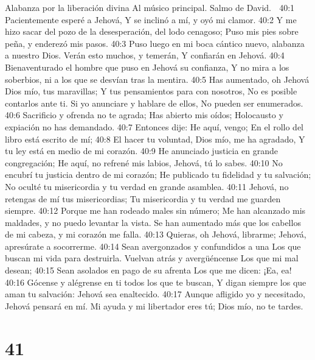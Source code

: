 Alabanza por la liberación divina 
Al músico principal. Salmo de David. 

40:1 Pacientemente esperé a Jehová, 
Y se inclinó a mí, y oyó mi clamor. 
40:2 Y me hizo sacar del pozo de la desesperación, del lodo cenagoso; 
Puso mis pies sobre peña, y enderezó mis pasos. 
40:3 Puso luego en mi boca cántico nuevo, alabanza a nuestro Dios. 
Verán esto muchos, y temerán, 
Y confiarán en Jehová. 
40:4 Bienaventurado el hombre que puso en Jehová su confianza, 
Y no mira a los soberbios, ni a los que se desvían tras la mentira. 
40:5 Has aumentado, oh Jehová Dios mío, tus maravillas; 
Y tus pensamientos para con nosotros, 
No es posible contarlos ante ti. 
Si yo anunciare y hablare de ellos, 
No pueden ser enumerados. 
40:6 Sacrificio y ofrenda no te agrada; 
Has abierto mis oídos; 
Holocausto y expiación no has demandado. 
40:7 Entonces dije: He aquí, vengo; 
En el rollo del libro está escrito de mí; 
40:8 El hacer tu voluntad, Dios mío, me ha agradado, 
Y tu ley está en medio de mi corazón. 
40:9 He anunciado justicia en grande congregación; 
He aquí, no refrené mis labios, 
Jehová, tú lo sabes. 
40:10 No encubrí tu justicia dentro de mi corazón; 
He publicado tu fidelidad y tu salvación; 
No oculté tu misericordia y tu verdad en grande asamblea. 
40:11 Jehová, no retengas de mí tus misericordias; 
Tu misericordia y tu verdad me guarden siempre. 
40:12 Porque me han rodeado males sin número; 
Me han alcanzado mis maldades, y no puedo levantar la vista. 
Se han aumentado más que los cabellos de mi cabeza, y mi corazón me falla. 
40:13 Quieras, oh Jehová, librarme; 
Jehová, apresúrate a socorrerme. 
40:14 Sean avergonzados y confundidos a una 
Los que buscan mi vida para destruirla. 
Vuelvan atrás y avergüéncense 
Los que mi mal desean; 
40:15 Sean asolados en pago de su afrenta 
Los que me dicen: ¡Ea, ea! 
40:16 Gócense y alégrense en ti todos los que te buscan, 
Y digan siempre los que aman tu salvación: 
Jehová sea enaltecido. 
40:17 Aunque afligido yo y necesitado, 
Jehová pensará en mí. 
Mi ayuda y mi libertador eres tú; 
Dios mío, no te tardes. 

\chapter{41}

